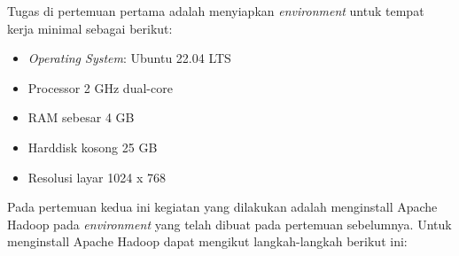 \documentclass[a4paper]{tufte-handout}
\begin{document}
Tugas di pertemuan pertama adalah menyiapkan \textit{environment} untuk tempat kerja minimal sebagai berikut:
\vspace*{-.3cm}
\begin{itemize}
\setlength\itemsep{0em}
\item \textit{Operating System}: Ubuntu 22.04 LTS
\item Processor 2 GHz dual-core
\item RAM sebesar 4 GB
\item Harddisk kosong 25 GB
\item Resolusi layar 1024 x 768
\end{itemize}
\vspace*{-.3cm}
\hrulefill

\clearpage
{}


Pada pertemuan kedua ini kegiatan yang dilakukan adalah menginstall Apache Hadoop pada \textit{environment} yang telah dibuat pada pertemuan sebelumnya. Untuk menginstall Apache Hadoop dapat mengikut langkah-langkah berikut ini:
\end{document}
